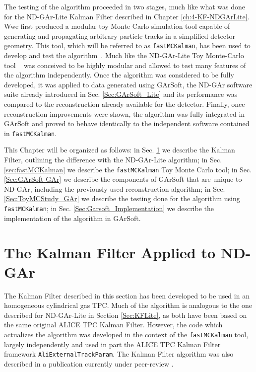 The testing of the algorithm proceeded in two stages, much like what was done for the ND-GAr-Lite Kalman Filter described in Chapter \ref{ch:4-KF-NDGArLite}. Wwe first produced a modular toy Monte Carlo simulation tool capable of generating and propagating arbitrary particle tracks in a simplified detector geometry. This tool, which will be referred to as \texttt{fastMCKalman}, has been used to develop and test the algorithm~\cite{fastMCKalman}. Much like the ND-GAr-Lite Toy Monte-Carlo tool ~\cite{fastMCKalman} was conceived to be highly modular and allowed to test many features of the algorithm independently. Once the algorithm was considered to be fully developed, it was applied to data generated using GArSoft, the ND-GAr software suite already introduced in Sec. \ref{Sec:GArSoft_Lite} and its performance was compared to the reconstruction already available for the detector. Finally, once reconstruction improvements were shown, the algorithm was fully integrated in GArSoft and proved to behave identically to the independent software contained in \texttt{fastMCKalman}.

This Chapter will be organized as follows: in Sec. \ref{Sec:KalGAr} we describe the Kalman Filter, outlining the difference with the ND-GAr-Lite algorithm; in Sec. \ref{sec:fastMCKalman} we describe the \texttt{fastMCKalman} Toy Monte Carlo tool; in Sec. \ref{Sec:GArSoft-GAr} we describe the components of GArSoft that are unique to ND-GAr, including the previously used reconstruction algorithm; in Sec. \ref{Sec:ToyMCStudy_GAr} we describe the testing done for the algorithm using \texttt{fastMCKalman}; in Sec. \ref{Sec:Garsoft_Implementation} we describe the implementation of the algorithm in GArSoft.


\section{The Kalman Filter Applied to ND-GAr}
\label{Sec:KalGAr}
The Kalman Filter described in this section has been developed to be used in an homogeneous cylindrical gas TPC. Much of the algorithm is analogous to the one described for ND-GAr-Lite in Section \ref{Sec:KFLite}, as both have been based on the same original ALICE TPC Kalman Filter. However, the code which actualizes the algorithm was developed in the context of the \texttt{fastMCKalman} tool, largely independently and used in part the ALICE TPC Kalman Filter framework \texttt{AliExternalTrackParam}. The Kalman Filter algorithm was also described in a publication currently under peer-review \cite{Battisti:2024nqq}.

